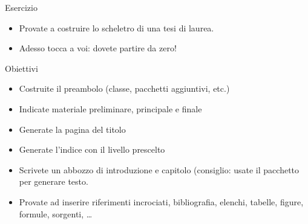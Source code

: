 \documentclass{beamer}
\begin{document}
\begin{frame}{Esercizio}
\begin{itemize}
\item Provate a costruire lo scheletro di una tesi di laurea.
\item Adesso tocca a voi: dovete partire da zero!
\end{itemize}

\begin{block}{Obiettivi}
\begin{itemize}
\item Costruite il preambolo (classe, pacchetti aggiuntivi, etc.)
\item Indicate  materiale preliminare, principale e finale
\item Generate la pagina del titolo
\item Generate l'indice con il livello prescelto
\item Scrivete un abbozzo di introduzione e capitolo (consiglio: usate il pacchetto  per generare testo.
\item Provate ad inserire riferimenti incrociati, bibliografia, elenchi, tabelle, figure, formule, sorgenti, \ldots
\end{itemize}
\end{block}

\end{frame}
\end{document}

